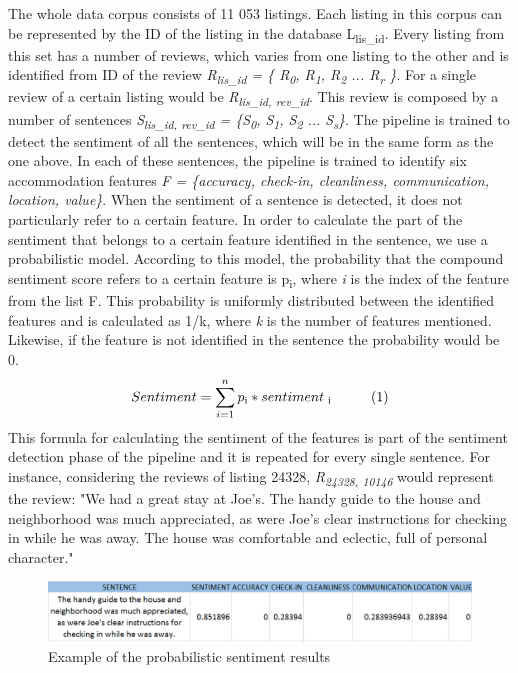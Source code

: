 The whole data corpus consists of 11 053 listings. Each listing in this corpus can be represented by the ID of the listing in the database L\textsubscript{lis\_id}. Every listing from this set has a number of reviews, which varies from one listing to the other and is identified from ID of the review \textit{R\textsubscript{lis\_id} = \{ R\textsubscript{0}, R\textsubscript{1},  R\textsubscript{2} ... R\textsubscript{r} \}}. For a single review of a certain listing would be \textit{R\textsubscript{lis\_id, rev\_id}}. This review is composed by a number of sentences \textit{S\textsubscript{lis\_id, rev\_id} = \{S\textsubscript{0}, S\textsubscript{1}, S\textsubscript{2} ... S\textsubscript{s}\}}. 
The pipeline is trained to detect the sentiment of all the sentences, which will be in the same form as the one above. 
In each of these sentences, the pipeline is trained to identify six accommodation features \textit{F = \{accuracy, check-in, cleanliness, communication, location, value\}}. When the sentiment of a sentence is detected, it does not particularly refer to a certain feature. In order to calculate the part of the sentiment that belongs to a certain feature identified in the sentence, we use a probabilistic model. According to this model, the probability that the compound sentiment score refers to a certain feature is p\textsubscript{i}, where \textit{i} is the index of the feature from the list F. This probability is uniformly distributed between the identified features and is calculated as 1/k, where \textit{k} is the number of features mentioned. Likewise, if the feature is not identified in the sentence the probability would be 0.
%
$$Sentiment = \sum_{i=1}^{n}p\textsubscript{i} *  sentiment\textsubscript{ i} \hspace{1cm} (1)$$ 
%
This formula for calculating the sentiment of the features is part of the sentiment detection phase of the pipeline and it is repeated for every single sentence. For instance, considering the reviews of listing 24328,  \textit{R\textsubscript{24328, 10146}} would represent the review: "We had a great stay at Joe's. The handy guide to the house and neighborhood was much appreciated, as were Joe's clear instructions for checking in while he was away. The house was comfortable and eclectic, full of personal character."
\begin{figure}[h!]
	\centering
	\includegraphics[height=0.1\textheight]{example_pip}
	\caption{Example of the probabilistic sentiment results}
	\label{fig:sent}
\end{figure}
